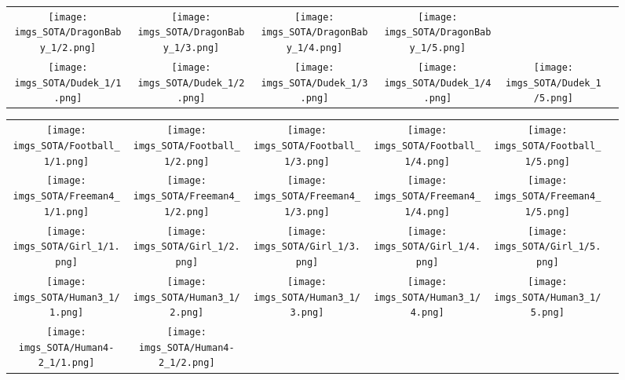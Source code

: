 \begin{figure}[H]
\begin{tabular}{@{}c@{}c@{}c@{}c@{}c@{}c@{}}
\texttt{[image: imgs\_SOTA/DragonBaby\_1/2.png]}&
\texttt{[image: imgs\_SOTA/DragonBaby\_1/3.png]}&
\texttt{[image: imgs\_SOTA/DragonBaby\_1/4.png]}&
\texttt{[image: imgs\_SOTA/DragonBaby\_1/5.png]}&
\\
\texttt{[image: imgs\_SOTA/Dudek\_1/1.png]}&
\texttt{[image: imgs\_SOTA/Dudek\_1/2.png]}&
\texttt{[image: imgs\_SOTA/Dudek\_1/3.png]}&
\texttt{[image: imgs\_SOTA/Dudek\_1/4.png]}&
\texttt{[image: imgs\_SOTA/Dudek\_1/5.png]}&
\\
\end{tabular}\end{figure}\begin{figure}[H]
\setlength{\tabcolsep}{6pt}
\renewcommand{\arraystretch}{0}
\begin{tabular}{@{}c@{}c@{}c@{}c@{}c@{}c@{}}\texttt{[image: imgs\_SOTA/Football\_1/1.png]}&
\texttt{[image: imgs\_SOTA/Football\_1/2.png]}&
\texttt{[image: imgs\_SOTA/Football\_1/3.png]}&
\texttt{[image: imgs\_SOTA/Football\_1/4.png]}&
\texttt{[image: imgs\_SOTA/Football\_1/5.png]}&
\\
\texttt{[image: imgs\_SOTA/Freeman4\_1/1.png]}&
\texttt{[image: imgs\_SOTA/Freeman4\_1/2.png]}&
\texttt{[image: imgs\_SOTA/Freeman4\_1/3.png]}&
\texttt{[image: imgs\_SOTA/Freeman4\_1/4.png]}&
\texttt{[image: imgs\_SOTA/Freeman4\_1/5.png]}&
\\
\texttt{[image: imgs\_SOTA/Girl\_1/1.png]}&
\texttt{[image: imgs\_SOTA/Girl\_1/2.png]}&
\texttt{[image: imgs\_SOTA/Girl\_1/3.png]}&
\texttt{[image: imgs\_SOTA/Girl\_1/4.png]}&
\texttt{[image: imgs\_SOTA/Girl\_1/5.png]}&
\\
\texttt{[image: imgs\_SOTA/Human3\_1/1.png]}&
\texttt{[image: imgs\_SOTA/Human3\_1/2.png]}&
\texttt{[image: imgs\_SOTA/Human3\_1/3.png]}&
\texttt{[image: imgs\_SOTA/Human3\_1/4.png]}&
\texttt{[image: imgs\_SOTA/Human3\_1/5.png]}&
\\
\texttt{[image: imgs\_SOTA/Human4-2\_1/1.png]}&
\texttt{[image: imgs\_SOTA/Human4-2\_1/2.png]}&

\end{tabular}
\end{figure}

